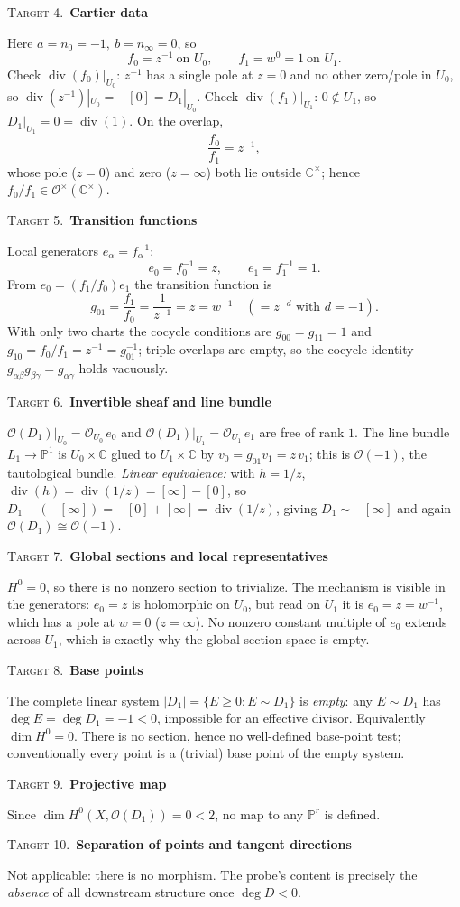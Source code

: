 \documentclass[11pt]{article}
\newcommand{\PP}{\mathbb P}
\newcommand{\CC}{\mathbb C}
\newcommand{\OO}{\mathcal O}
\newcommand{\divisor}{\operatorname{div}}
\newcommand{\target}[2]{\medskip\noindent%
  {\small\textsc{\textcolor{accent}{Target #1.}}}\ \textbf{\textcolor{inkblue}{#2}}\par\nopagebreak\smallskip}
\theoremstyle{plain}
\theoremstyle{definition}
\begin{document}
\target{4}{Cartier data}
Here $a=n_0=-1,\ b=n_\infty=0$, so
\[
  f_0=z^{-1}\ \text{on }U_0,\qquad f_1=w^{0}=1\ \text{on }U_1 .
\]
Check $\divisor(f_0)|_{U_0}$: $z^{-1}$ has a single pole at $z=0$ and no other
zero/pole in $U_0$, so $\divisor(z^{-1})|_{U_0}=-[0]=D_1|_{U_0}$. Check
$\divisor(f_1)|_{U_1}$: $0\notin U_1$, so $D_1|_{U_1}=0=\divisor(1)$. On the
overlap,
\[
  \frac{f_0}{f_1}=z^{-1},
\]
whose pole ($z=0$) and zero ($z=\infty$) both lie outside $\CC^\times$; hence
$f_0/f_1\in\OO^\times(\CC^\times)$.

\target{5}{Transition functions}
Local generators $e_\alpha=f_\alpha^{-1}$:
\[
  e_0=f_0^{-1}=z,\qquad e_1=f_1^{-1}=1 .
\]
From $e_0=(f_1/f_0)e_1$ the transition function is
\[
  g_{01}=\frac{f_1}{f_0}=\frac{1}{z^{-1}}=z=w^{-1}\quad(=z^{-d}\text{ with }d=-1).
\]
With only two charts the cocycle conditions are $g_{00}=g_{11}=1$ and
$g_{10}=f_0/f_1=z^{-1}=g_{01}^{-1}$; triple overlaps are empty, so the cocycle
identity $g_{\alpha\beta}g_{\beta\gamma}=g_{\alpha\gamma}$ holds vacuously.

\target{6}{Invertible sheaf and line bundle}
$\OO(D_1)|_{U_0}=\OO_{U_0}\,e_0$ and $\OO(D_1)|_{U_1}=\OO_{U_1}\,e_1$ are free of
rank $1$. The line bundle $L_1\to\PP^1$ is $U_0\times\CC$ glued to $U_1\times\CC$
by $v_0=g_{01}v_1=z\,v_1$; this is $\OO(-1)$, the tautological bundle.
\emph{Linear equivalence:} with $h=1/z$, $\divisor(h)=\divisor(1/z)=[\infty]-[0]$,
so $D_1-(-[\infty])=-[0]+[\infty]=\divisor(1/z)$, giving $D_1\sim-[\infty]$ and
again $\OO(D_1)\cong\OO(-1)$.

\target{7}{Global sections and local representatives}
$H^0=0$, so there is no nonzero section to trivialize. The mechanism is visible
in the generators: $e_0=z$ is holomorphic on $U_0$, but read on $U_1$ it is
$e_0=z=w^{-1}$, which has a pole at $w=0$ ($z=\infty$). No nonzero constant
multiple of $e_0$ extends across $U_1$, which is exactly why the global section
space is empty.

\target{8}{Base points}
The complete linear system $|D_1|=\{E\ge0:E\sim D_1\}$ is \emph{empty}: any
$E\sim D_1$ has $\deg E=\deg D_1=-1<0$, impossible for an effective divisor.
Equivalently $\dim H^0=0$. There is no section, hence no well-defined base-point
test; conventionally every point is a (trivial) base point of the empty system.

\target{9}{Projective map}
Since $\dim H^0(X,\OO(D_1))=0<2$, no map to any $\PP^{r}$ is defined.

\target{10}{Separation of points and tangent directions}
Not applicable: there is no morphism. The probe's content is precisely the
\emph{absence} of all downstream structure once $\deg D<0$.
\end{document}
